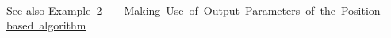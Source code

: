  ~\newline
 \begin{DoxySeeAlso}{See also}
\mbox{\hyperlink{page_Code_02_RMLPositionSampleApplication}{Example 2 --- Making Use of Output Parameters of the Position-\/based algorithm}} 
\end{DoxySeeAlso}
